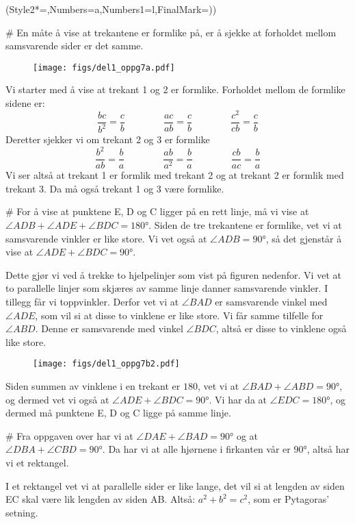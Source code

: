 \begin{easylist}[enumerate]
	\ListProperties(Style2*=,Numbers=a,Numbers1=l,FinalMark={)})
	
	# En måte å vise at trekantene er formlike på, er å sjekke at forholdet mellom samsvarende sider er det samme. 
	\begin{figure}[ht!]
		\centering
		\texttt{[image: figs/del1\_oppg7a.pdf]}
		\label{fig:del1_oppg7a}
	\end{figure}	
	Vi starter med å vise at trekant 1 og 2 er formlike. Forholdet mellom de formlike sidene er:
	\begin{equation*}
			\frac{bc}{b^2}  = \frac{c}{b} \qquad \qquad
			\frac{ac}{ab}  = \frac{c}{b} \qquad \qquad
			\frac{c^2}{cb}  = \frac{c}{b}
	\end{equation*}
	Deretter sjekker vi om trekant 2 og 3 er formlike
	\begin{equation*}
			\frac{b^2}{ab} = \frac{b}{a} \qquad \qquad
			\frac{ab}{a^2} = \frac{b}{a} \qquad \qquad
			\frac{cb}{ac} = \frac{b}{a}
	\end{equation*}
	Vi ser altså at trekant 1 er formlik med trekant 2 og at trekant 2 er formlik med trekant 3. 
	Da må også trekant 1 og 3 være formlike. 
	
	# For å vise at punktene E, D og C ligger på en rett linje, må vi vise at $ \angle ADB + \angle ADE + \angle BDC = \ang{180} $. 
	Siden de tre trekantene er formlike, vet vi at samsvarende vinkler er like store. 
	Vi vet også at $\angle ADB = \ang{90}$, så det gjenstår å vise at $\angle ADE + \angle BDC = \ang{90}$.
	
	Dette gjør vi ved å trekke to hjelpelinjer som vist på figuren nedenfor. 
	Vi vet at to parallelle linjer som skjæres av samme linje danner samsvarende vinkler. 
	I tillegg får vi toppvinkler. Derfor vet vi at $\angle BAD$ er samsvarende vinkel med $\angle ADE$, som vil si at disse to vinklene er like store. 
	Vi får samme tilfelle for $\angle ABD$. 
	Denne er samsvarende med vinkel $\angle BDC$, altså er disse to vinklene også like store.
	\begin{figure}[ht!]
		\centering
		\texttt{[image: figs/del1\_oppg7b2.pdf]}
		\label{fig:del1_oppg7b}
	\end{figure}
	Siden summen av vinklene i en trekant er $180$, vet vi at $\angle BAD + \angle  ABD = \ang{90}$, og dermed vet vi også at $\angle ADE + \angle BDC = \ang{90}$. 
	Vi har da at $\angle EDC  = \ang{180}$, og dermed må punktene E, D og C ligge på samme linje.
	
	# Fra oppgaven over har vi at $\angle DAE + \angle BAD = \ang{90}$ og at $\angle DBA + \angle CBD = \ang{90}$. 
	Da har vi at alle hjørnene i firkanten vår er $\ang{90}$, altså har vi et rektangel. 
	
	I et rektangel vet vi at parallelle sider er like lange, det vil si at lengden av siden EC skal være lik lengden av siden AB. 
	Altså: $a^2 + b^2 = c^2$, som er Pytagoras' setning.
\end{easylist}


